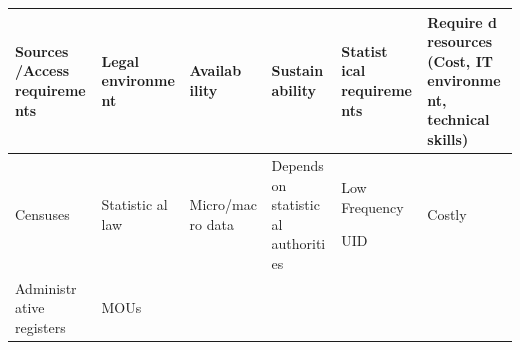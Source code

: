 \documentclass[
]{article}
\begin{document}
\begin{longtable}[]{@{}llllll@{}}
\toprule
\begin{minipage}[b]{0.14\columnwidth}\raggedright
\textbf{Sources
/Access
requireme
nts}\strut
\end{minipage} & \begin{minipage}[b]{0.14\columnwidth}\raggedright
\textbf{Legal
environme
nt}\strut
\end{minipage} & \begin{minipage}[b]{0.14\columnwidth}\raggedright
\textbf{Availab
ility}\strut
\end{minipage} & \begin{minipage}[b]{0.14\columnwidth}\raggedright
\textbf{Sustain
ability}\strut
\end{minipage} & \begin{minipage}[b]{0.14\columnwidth}\raggedright
\textbf{Statist
ical
requireme
nts}\strut
\end{minipage} & \begin{minipage}[b]{0.14\columnwidth}\raggedright
\textbf{Require
d
resources
(Cost, IT
environme
nt,
technical
skills)}\strut
\end{minipage}\tabularnewline
\midrule
\endhead
\begin{minipage}[t]{0.14\columnwidth}\raggedright
Censuses\strut
\end{minipage} & \begin{minipage}[t]{0.14\columnwidth}\raggedright
Statistic
al
law\strut
\end{minipage} & \begin{minipage}[t]{0.14\columnwidth}\raggedright
Micro/mac
ro
data\strut
\end{minipage} & \begin{minipage}[t]{0.14\columnwidth}\raggedright
Depends
on
statistic
al
authoriti
es\strut
\end{minipage} & \begin{minipage}[t]{0.14\columnwidth}\raggedright
Low
Frequency

UID\strut
\end{minipage} & \begin{minipage}[t]{0.14\columnwidth}\raggedright
Costly\strut
\end{minipage}\tabularnewline
\begin{minipage}[t]{0.14\columnwidth}\raggedright
Administr
ative
registers\strut
\end{minipage} & \begin{minipage}[t]{0.14\columnwidth}\raggedright
MOUs


\end{minipage}
\end{longtable}
\end{document}
